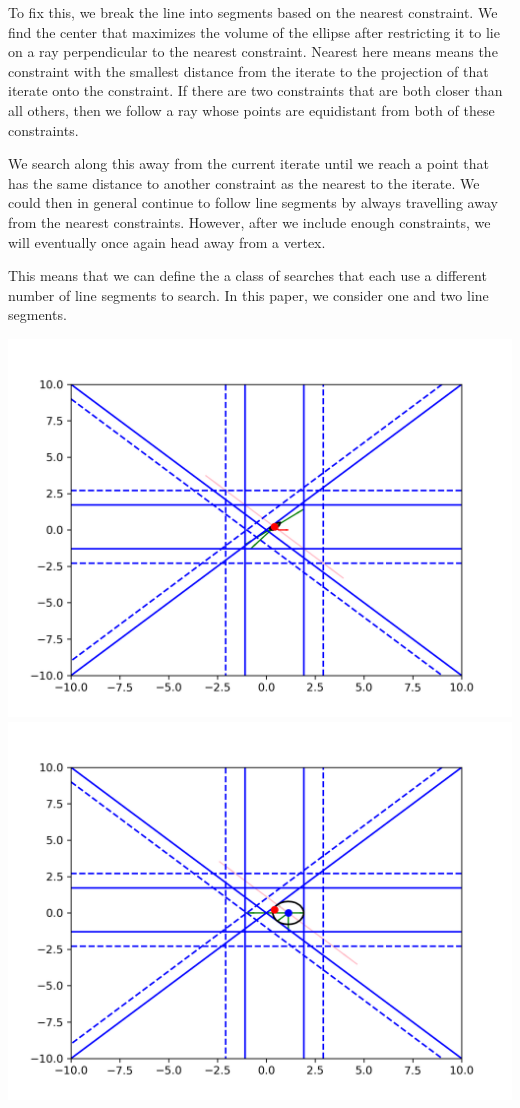\documentclass{article}
\begin{document}
To fix this, we break the line into segments based on the nearest constraint.
We find the center that maximizes the volume of the ellipse after restricting it to lie on a ray perpendicular to the nearest constraint.
Nearest here means means the constraint with the smallest distance from the iterate to the projection of that iterate onto the constraint.
If there are two constraints that are both closer than all others, then we follow a ray whose points are equidistant from both of these constraints.

We search along this away from the current iterate until we reach a point that has the same distance to another constraint as the nearest to the iterate.
We could then in general continue to follow line segments by always travelling away from the nearest constraints.
However, after we include enough constraints, we will eventually once again head away from a vertex.

This means that we can define the a class of searches that each use a different number of line segments to search.
In this paper, we consider one and two line segments.

\includegraphics[scale=0.4]{run_away_1.png}
\includegraphics[scale=0.4]{run_away_2.png}
\end{document}

